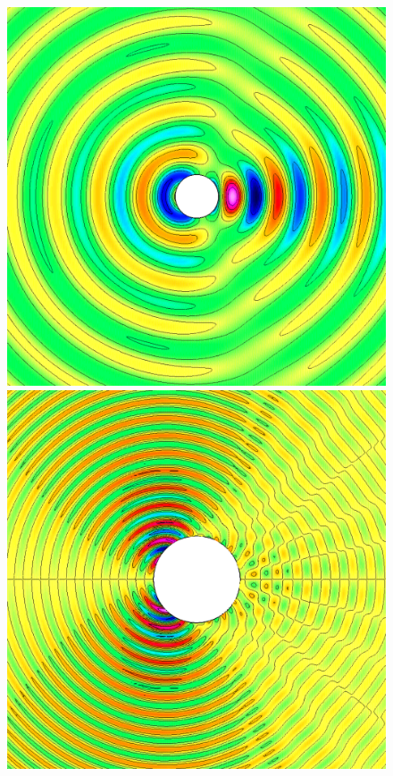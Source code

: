 \begin{figure}
\begin{center}
\includegraphics[width=\figWidth]{figures/scatCyl-cibc2a-order4Hz}
\includegraphics[width=\figWidth]{figures/scatCyl-cibc2a-order4-k5-Ex}

\end{center}
\end{figure}
